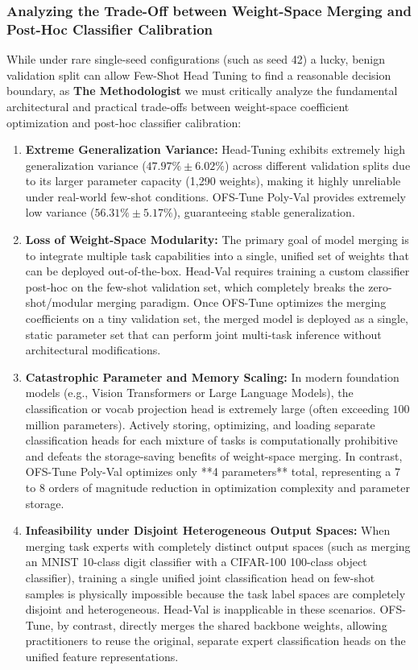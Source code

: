 \subsubsection{Analyzing the Trade-Off between Weight-Space Merging and Post-Hoc Classifier Calibration}
While under rare single-seed configurations (such as seed 42) a lucky, benign validation split can allow Few-Shot Head Tuning to find a reasonable decision boundary, as {\textbf{The Methodologist}} we must critically analyze the fundamental architectural and practical trade-offs between weight-space coefficient optimization and post-hoc classifier calibration:
\begin{enumerate}[noitemsep,topsep=0pt]
    \item \textbf{Extreme Generalization Variance:} Head-Tuning exhibits extremely high generalization variance ($47.97\% \pm 6.02\%$) across different validation splits due to its larger parameter capacity (1,290 weights), making it highly unreliable under real-world few-shot conditions. OFS-Tune Poly-Val provides extremely low variance ($56.31\% \pm 5.17\%$), guaranteeing stable generalization.
    \item \textbf{Loss of Weight-Space Modularity:} The primary goal of model merging is to integrate multiple task capabilities into a single, unified set of weights that can be deployed out-of-the-box. Head-Val requires training a custom classifier post-hoc on the few-shot validation set, which completely breaks the zero-shot/modular merging paradigm. Once OFS-Tune optimizes the merging coefficients on a tiny validation set, the merged model is deployed as a single, static parameter set that can perform joint multi-task inference without architectural modifications.
    \item \textbf{Catastrophic Parameter and Memory Scaling:} In modern foundation models (e.g., Vision Transformers or Large Language Models), the classification or vocab projection head is extremely large (often exceeding $100$ million parameters). Actively storing, optimizing, and loading separate classification heads for each mixture of tasks is computationally prohibitive and defeats the storage-saving benefits of weight-space merging. In contrast, OFS-Tune Poly-Val optimizes only **4 parameters** total, representing a $7$ to $8$ orders of magnitude reduction in optimization complexity and parameter storage.
    \item \textbf{Infeasibility under Disjoint Heterogeneous Output Spaces:} When merging task experts with completely distinct output spaces (such as merging an MNIST 10-class digit classifier with a CIFAR-100 100-class object classifier), training a single unified joint classification head on few-shot samples is physically impossible because the task label spaces are completely disjoint and heterogeneous. Head-Val is inapplicable in these scenarios. OFS-Tune, by contrast, directly merges the shared backbone weights, allowing practitioners to reuse the original, separate expert classification heads on the unified feature representations.

\end{enumerate}
